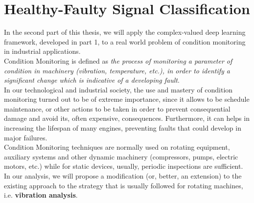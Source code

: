 \documentclass[../main.tex]{subfiles}
\begin{document}
	
\chapter{Healthy-Faulty Signal Classification}

In the second part of this thesis, we will apply the complex-valued deep learning framework, developed in part 1, to a real world problem of condition monitoring in industrial applications.\\
Condition Monitoring is defined as \textit{the process of monitoring a parameter of condition in machinery (vibration, temperature, etc.), in order to identify a significant change which is indicative of a developing fault}.\\
In our technological and industrial society, the use and mastery of condition monitoring turned out to be of extreme importance, since it allows to be schedule maintenance, or other actions to be taken in order to prevent consequential damage and avoid its, often expensive, consequences. Furthermore, it can helps in increasing the lifespan of many engines, preventing faults that could develop in major failures.\\	
Condition Monitoring techniques are normally used on rotating equipment, auxiliary systems and other dynamic machinery (compressors, pumps, electric motors, etc.) while for static devices, usually, periodic inspections are sufficient.\\
In our analysis, we will propose a modification (or, better, an extension) to the existing approach to the strategy that is usually followed for rotating machines, i.e. \textbf{vibration analysis}.\\
\end{document}

